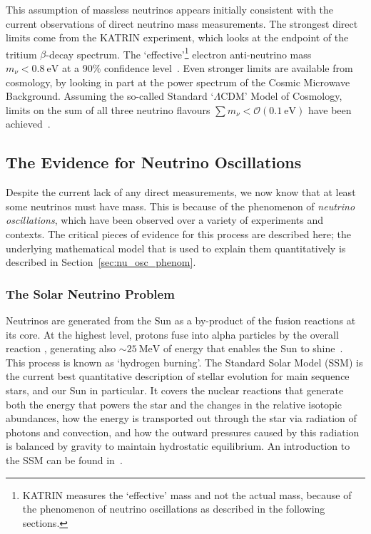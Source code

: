 This assumption of massless neutrinos appears initially consistent with the current observations of direct neutrino mass measurements. The strongest direct limits come from the KATRIN experiment, which looks at the endpoint of the tritium $\beta$-decay spectrum. The `effective'\footnote{
    KATRIN measures the `effective' mass and not the actual mass, because of the phenomenon of neutrino oscillations as described in the following sections.
} electron anti-neutrino mass $m_{\nu} < \SI{0.8}{\eV}$ at a 90\% confidence level~\cite{}. %
Even stronger limits are available from cosmology, by looking in part at the power spectrum of the Cosmic Microwave Background. Assuming the so-called Standard `$\Lambda$CDM' Model of Cosmology, limits on the sum of all three neutrino flavours $\sum m_{\nu}<\mathcal{O}(\SI{0.1}{\eV})$ have been achieved~\cite{}. %

\subsection{The Evidence for Neutrino Oscillations}\label{sec:nu_osc_evidence}
Despite the current lack of any direct measurements, we now know that at least some neutrinos must have mass. This is because of the phenomenon of \textit{neutrino oscillations}, which have been observed over a variety of experiments and contexts. The critical pieces of evidence for this process are described here; the underlying mathematical model that is used to explain them quantitatively is described in Section~\ref{sec:nu_osc_phenom}.

\subsubsection{The Solar Neutrino Problem}
Neutrinos are generated from the Sun as a by-product of the fusion reactions at its core. At the highest level, protons fuse into alpha particles by the overall reaction , generating also $\sim\SI{25}{\MeV}$ of energy that enables the Sun to shine~\cite{}. %
This process is known as `hydrogen burning'. The Standard Solar Model (SSM) is the current best quantitative description of stellar evolution for main sequence stars, and our Sun in particular. It covers the nuclear reactions that generate both the energy that powers the star and the changes in the relative isotopic abundances, how the energy is transported out through the star via radiation of photons and convection, and how the outward pressures caused by this radiation is balanced by gravity to maintain hydrostatic equilibrium. An introduction to the SSM can be found in~\cite{}. %

